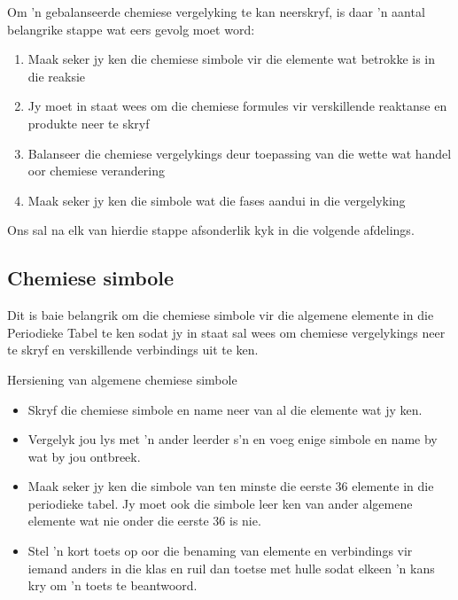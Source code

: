 Om 'n gebalanseerde chemiese vergelyking te kan neerskryf, is daar 'n aantal belangrike stappe
wat eers gevolg moet word: 
      \label{m38721*id62681}\begin{enumerate}[noitemsep, label=\textbf{\arabic*}. ] 
            \label{m38721*uid1}\item Maak seker jy ken die chemiese simbole vir die elemente wat betrokke is in die reaksie
\label{m38721*uid2}\item Jy moet in staat wees om die chemiese formules vir verskillende reaktanse en produkte neer te skryf
\label{m38721*uid3}\item Balanseer die chemiese vergelykings deur toepassing van die wette wat handel oor chemiese verandering 
\label{m38721*uid4}\item Maak seker jy ken die simbole wat die fases aandui in die vergelyking
\end{enumerate}
Ons sal na elk van hierdie stappe afsonderlik kyk in die volgende afdelings.
    \label{m38721*cid2}
            \subsection*{Chemiese simbole}
            \nopagebreak
Dit is baie belangrik om die chemiese simbole vir die algemene elemente in die Periodieke Tabel te ken
sodat jy in staat sal wees om chemiese vergelykings neer te skryf en verskillende verbindings uit te ken.\\
            \begin{activity}{Hersiening van algemene chemiese simbole}
            \nopagebreak
      \label{m38721*id62763}\begin{itemize}[noitemsep]
            \label{m38721*uid5}\item Skryf die chemiese simbole en name neer van al die elemente wat jy ken.
\label{m38721*uid6}\item Vergelyk jou lys met 'n ander leerder s’n en voeg enige simbole en name by wat by jou ontbreek.
\label{m38721*uid7}\item Maak seker jy ken die simbole van ten minste die eerste 36 elemente in die periodieke tabel. Jy moet ook die simbole leer ken van ander algemene elemente wat nie onder die eerste 36 is nie.
\label{m38721*uid8}\item Stel 'n kort toets op oor die benaming van elemente en verbindings vir iemand anders in die klas en ruil dan toetse met hulle sodat elkeen  'n kans kry om  'n toets te beantwoord.
\end{itemize}
\end{activity}
    \label{m38721*cid3}
